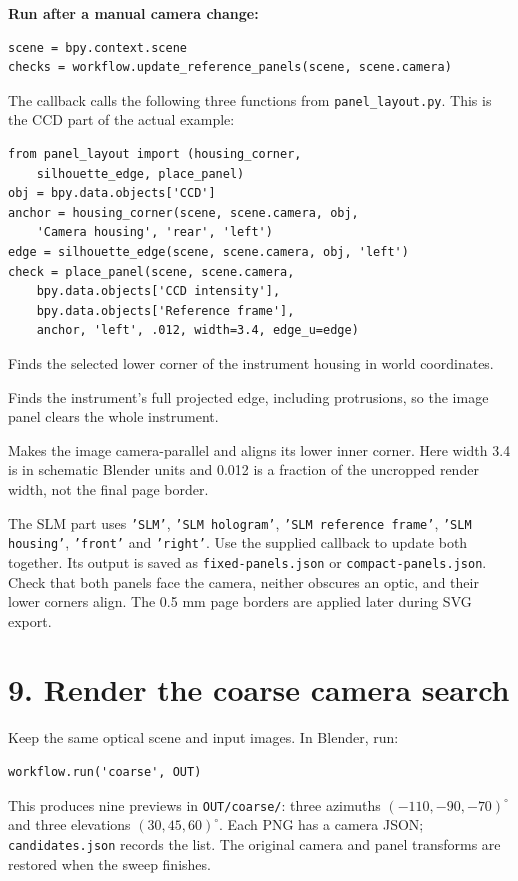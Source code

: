 \documentclass[11pt,a4paper]{article}
\begin{document}
\textbf{Run after a manual camera change:}
\begin{Verbatim}[fontsize=\small]
scene = bpy.context.scene
checks = workflow.update_reference_panels(scene, scene.camera)
\end{Verbatim}
The callback calls the following three functions from \texttt{panel\_layout.py}. This is the CCD part of the actual example:
\begin{Verbatim}[fontsize=\small]
from panel_layout import (housing_corner,
    silhouette_edge, place_panel)
obj = bpy.data.objects['CCD']
anchor = housing_corner(scene, scene.camera, obj,
    'Camera housing', 'rear', 'left')
edge = silhouette_edge(scene, scene.camera, obj, 'left')
check = place_panel(scene, scene.camera,
    bpy.data.objects['CCD intensity'],
    bpy.data.objects['Reference frame'],
    anchor, 'left', .012, width=3.4, edge_u=edge)
\end{Verbatim}
\begin{description}[style=nextline]
\item[\texttt{housing\_corner}] Finds the selected lower corner of the instrument housing in world coordinates.
\item[\texttt{silhouette\_edge}] Finds the instrument's full projected edge, including protrusions, so the image panel clears the whole instrument.
\item[\texttt{place\_panel}] Makes the image camera-parallel and aligns its lower inner corner. Here width 3.4 is in schematic Blender units and 0.012 is a fraction of the uncropped render width, not the final page border.
\end{description}
The SLM part uses \texttt{'SLM'}, \texttt{'SLM hologram'}, \texttt{'SLM reference frame'}, \texttt{'SLM housing'}, \texttt{'front'} and \texttt{'right'}. Use the supplied callback to update both together. Its output is saved as \texttt{fixed-panels.json} or \texttt{compact-panels.json}. Check that both panels face the camera, neither obscures an optic, and their lower corners align. The 0.5 mm page borders are applied later during SVG export.

\clearpage
\section*{9. Render the coarse camera search}
Keep the same optical scene and input images. In Blender, run:
\begin{Verbatim}[fontsize=\small]
workflow.run('coarse', OUT)
\end{Verbatim}
This produces nine previews in \texttt{OUT/coarse/}: three azimuths $(-110,-90,-70)^\circ$ and three elevations $(30,45,60)^\circ$. Each PNG has a camera JSON; \texttt{candidates.json} records the list. The original camera and panel transforms are restored when the sweep finishes.
\end{document}

